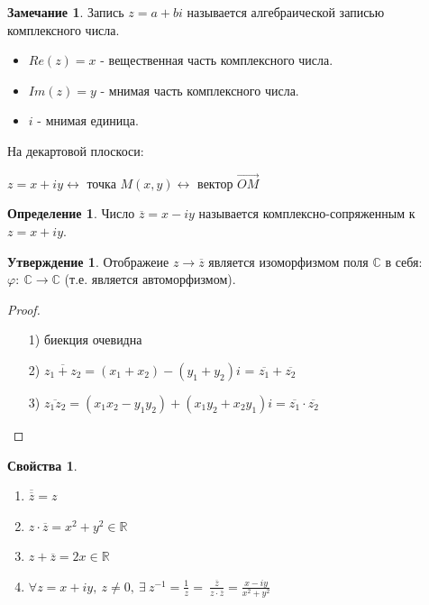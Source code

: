 \documentclass[a4paper, 12pt]{article}
\newcommand{\R}{\mathbb R}
\renewcommand{\phi}{\varphi}
\newcommand\tab[1][.5cm]{\hspace*{#1}}
\theoremstyle{definition}
\newtheorem*{definition}{Определение}
\newtheorem*{subtheorem}{Утверждение}
\newtheorem*{remark}{Замечание}
\newtheorem*{properties}{Свойства}
\begin{document}
  \begin{remark}
    Запись $z=a+bi$ называется алгебраической записью комплексного числа.
    \begin{itemize}
      \item $Re (z) = x$ - вещественная часть комплексного числа.
      \item $Im (z) = y$ - мнимая часть комплексного числа.
      \item $i$ - мнимая единица.
    \end{itemize}
    На декартовой плоскоси: 
    \begin{center}
    \end{center}
    \begin{center}
      $z = x + iy \longleftrightarrow $ точка $M(x,y) \longleftrightarrow$ вектор $\overrightarrow{OM}$
    \end{center} 
  \end{remark}  
  \begin{definition}
    Число $\overline{z} = x-iy$ называется комплексно-сопряженным к\\ $z = x+iy$.
  \end{definition} 
  \begin{subtheorem}
    Отображеие $z \to \overline{z}$ является изоморфизмом поля $\mathbb{C}$ в себя: $\phi: \ \mathbb{C} \to \mathbb{C}$  (т.е. является автоморфизмом). 
  \end{subtheorem} 
  \begin{proof}\tab
    \begin{itemize}
      \item[1)] биекция очевидна
      \item[2)] $\overline{z_1+z_2} = (x_1 + x_2)-(y_1+y_2)i$  = $\overline{z_1}+\overline{z_2}$
      \item[3)] $\overline{z_1z_2} = (x_1x_2-y_1y_2)+(x_1y_2+x_2y_1)i = \overline{z_1}\cdot \overline{z_2}$
    \end{itemize}
  \end{proof} 
  \begin{properties}\tab
    \begin{enumerate}
      \item $\overline{\overline{z}} = z$
      \item $z \cdot \overline{z} = x^2 + y^2 \in \R$
      \item $ z + \overline{z} = 2x \in \R$ 
      \item $ \forall z = x + iy, \ z \neq 0, \ \exists \ z^{-1} = \frac{1}{z} = \ \frac{\overline{z}}{z \cdot \overline{z}} = \frac{x-iy}{x^2 + y^2}$   
    \end{enumerate}
  \end{properties}
\end{document}
